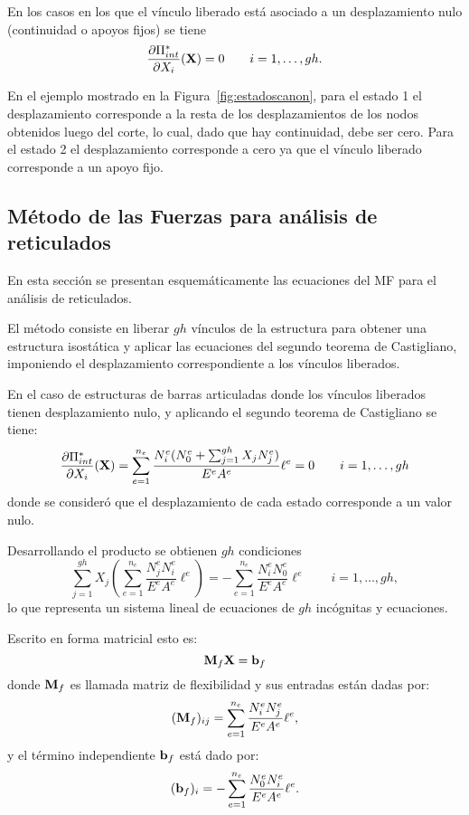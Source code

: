 En los casos en los que el vínculo liberado está asociado a un desplazamiento nulo (continuidad o apoyos fijos) se tiene
%
\begin{equation}
\frac{\partial \Pi_{int}^*}{ \partial X_i}({\bf X}) = 0 \qquad i=1,\dots,gh.
\end{equation}

En el ejemplo mostrado en la Figura~\ref{fig:estadoscanon}, para el estado 1 el desplazamiento corresponde a la resta de los desplazamientos de los nodos obtenidos luego del corte, lo cual, dado que hay continuidad, debe ser cero. %
%
Para el estado 2 el desplazamiento corresponde a cero ya que el vínculo liberado corresponde a un apoyo fijo. %
%


\subsection{Método de las Fuerzas para análisis de reticulados}

En esta sección se presentan esquemáticamente las ecuaciones del MF para el análisis de reticulados.


El método consiste en liberar $gh$ vínculos de la estructura para obtener una estructura isostática y aplicar las ecuaciones del segundo teorema de Castigliano, imponiendo el desplazamiento correspondiente a los vínculos liberados. %

En el caso de estructuras de barras articuladas donde los vínculos liberados tienen desplazamiento nulo, y aplicando el segundo teorema de Castigliano se tiene:
%
\begin{equation}
 \frac{\partial \Pi_{int}^*}{ \partial X_i}({\bf X}) =  \sum_{e=1}^{n_e} \frac{N_i^e(N_0^e + \sum_{j=1}^{gh} X_j N_j^e)}{E^e A^e} \ell^e = 0
 \qquad i=1,\dots, gh
\end{equation}
%
donde se consideró que el desplazamiento de cada estado corresponde a un valor nulo. %

Desarrollando el producto se obtienen $gh$ condiciones
\begin{equation}
\sum_{j=1}^{gh}  X_j \left( \sum_{e=1}^{n_e}  \frac{ N_j^e N_i^e } {E^e A^e} \ell^e \right) = - \sum_{e=1}^{n_e} \frac{N_i^e N_0^e } {E^e A^e} \ell^e \qquad i=1,\dots,gh,
\end{equation}
%
lo que representa un sistema lineal de ecuaciones de $gh$ incógnitas y ecuaciones.


Escrito en forma matricial esto es:
\begin{equation}\label{eqn:ecflex}
{\bf M}_f {\bf X} = {\bf b}_f
\end{equation}
%
donde ${\bf M}_f$ es llamada matriz de flexibilidad y sus entradas están dadas por:
%
\begin{equation}
({\bf M}_f)_{ij} =  \sum_{e=1}^{n_e} \frac{N_i^e N_j^e }{E^e A^e} \ell^e,
\end{equation}
y el término independiente ${\bf b}_f$ está dado por:
%
\begin{equation}
({\bf b}_f)_{i} =  - \sum_{e=1}^{n_e} \frac{N_0^e N_i^e }{E^e A^e} \ell^e.
\end{equation}

